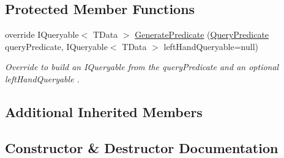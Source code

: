 \subsection*{Protected Member Functions}
\begin{DoxyCompactItemize}
\item 
override I\+Queryable$<$ T\+Data $>$ \hyperlink{classCqrs_1_1Azure_1_1BlobStorage_1_1Test_1_1Integration_1_1TableStorageDataStoreTests_1_1TestQueryBuilder_a4b65d9a13c425df0aa5bd309fc1824de_a4b65d9a13c425df0aa5bd309fc1824de}{Generate\+Predicate} (\hyperlink{classCqrs_1_1Repositories_1_1Queries_1_1QueryPredicate}{Query\+Predicate} query\+Predicate, I\+Queryable$<$ T\+Data $>$ left\+Hand\+Queryable=null)
\begin{DoxyCompactList}\small\item\em Override to build an I\+Queryable from the {\itshape query\+Predicate}  and an optional {\itshape left\+Hand\+Queryable} . \end{DoxyCompactList}\end{DoxyCompactItemize}
\subsection*{Additional Inherited Members}


\subsection{Constructor \& Destructor Documentation}
\mbox{\label{classCqrs_1_1Azure_1_1BlobStorage_1_1Test_1_1Integration_1_1TableStorageDataStoreTests_1_1TestQueryBuilder_ada46a3061a76cebf70f07e5286c73f85_ada46a3061a76cebf70f07e5286c73f85}} 

